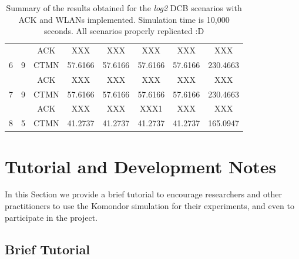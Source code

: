 \documentclass[a4paper]{article}
\begin{document}
\begin{table}[h!]
\begin{tabular}{|c|c|c|c|c|c|c|c|}
		                                            &                                              & ACK       & XXX    &XXX    & XXX    & XXX    & XXX   \\ \cline{3-8} 
		\multirow{-2}{*}{6}                         & \multirow{-2}{*}{9}                          & CTMN          & 57.6166    & 57.6166    & 57.6166    & 57.6166    & 230.4663   \\ \hline
		                                            &                                              & ACK       & XXX    & XXX    & XXX    & XXX    & XXX   \\ \cline{3-8} 
		\multirow{-2}{*}{7}                         & \multirow{-2}{*}{9}                          & CTMN          & 57.6166    & 57.6166    & 57.6166    & 57.6166    & 230.4663   \\ \hline
		                                            &                                              & ACK       & XXX   & XXX    &XXX1    & XXX   &XXX   \\ \cline{3-8} 
		\multirow{-2}{*}{8}                         & \multirow{-2}{*}{5}                          & CTMN          & 41.2737    & 41.2737    & 41.2737    & 41.2737    & 165.0947   \\ \hline
		\end{tabular}
		\caption{Summary of the results obtained for the \textit{log2} DCB scenarios with ACK and WLANs implemented. Simulation time is 10,000 seconds. All scenarios properly replicated :D}
		\label{table:scenario_4wlans}
	\end{table}
	
\section{Tutorial and Development Notes}
\label{section:tutorial_and_development_notes}
	In this Section we provide a brief tutorial to encourage researchers and other practitioners to use the Komondor simulation for their experiments, and even to participate in the project. 
	
	\subsection{Brief Tutorial}
	\label{section:brief_tutorial}
	
\end{document}
